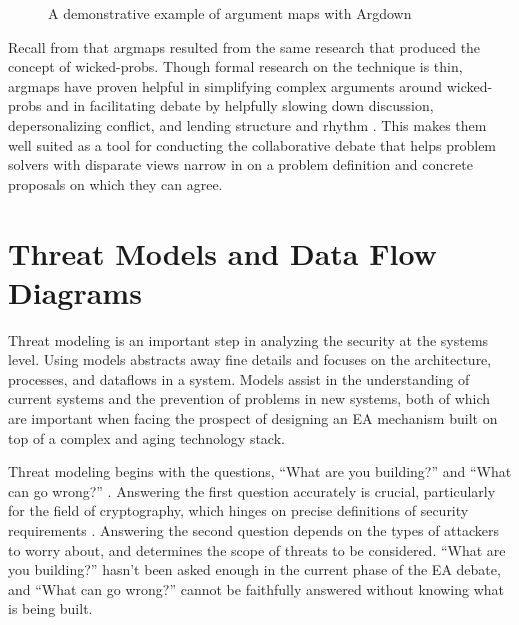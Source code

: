 \begin{figure}[ht]
    \centering\CaptionFontSize
    \caption{A demonstrative example of argument maps with Argdown}
    \label{fig-args-demo}
\end{figure}


Recall from  that \acp{argmap} resulted from the same research that produced the concept of
\acp{wicked-prob}. Though formal research on the technique is thin, \acp{argmap} have proven helpful in simplifying
complex arguments around \acp{wicked-prob} \cite{renton_2007} and in facilitating debate by helpfully slowing down
discussion, depersonalizing conflict, and lending structure and rhythm \cite{dutoit_hypermedia_2006}. This makes them
well suited as a tool for conducting the collaborative debate that helps problem solvers with disparate views narrow in
on a problem definition and concrete proposals on which they can agree.



\section{Threat Models and Data Flow Diagrams}
\label{sec-threat-model-intro}

Threat modeling is an important step in analyzing the security at the systems level. Using models abstracts away fine
details and focuses on the architecture, processes, and dataflows in a system. Models assist in the understanding of
current systems and the prevention of problems in new systems, both of which are important when facing the prospect of
designing an \ac{EA} mechanism built on top of a complex and aging technology stack.

Threat modeling begins with the questions, ``What are you building?'' and ``What can go wrong?''
\cite{shostack_threat_2014}. Answering the first question accurately is crucial, particularly for the field of
cryptography, which hinges on precise definitions of security requirements \cite{varia_2018}. Answering the second
question depends on the types of attackers to worry about, and determines the scope of threats to be considered. ``What
are you building?'' hasn't been asked enough in the current phase of the \ac{EA} debate, and ``What can go wrong?''
cannot be faithfully answered without knowing what is being built.

